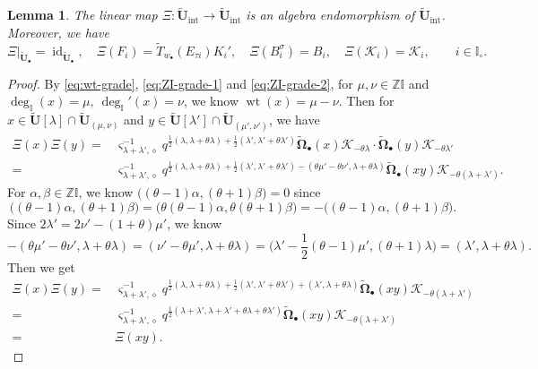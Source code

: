 \documentclass[a4paper,reqno,12pt]{amsart}
\numberwithin{equation}{section}
\newtheorem{lemma}[proposition]{Lemma}
\theoremstyle{definition}
\theoremstyle{plain}
\theoremstyle{definition}
\def\Z{\mathbb Z}
\def\I{\mathbb I}
\def\wI{\I_\circ}
\def\bw{w_\bullet}
\def\tU{\widetilde{\mathbf U}}
\def \tbU{\tU_{\bullet}}
\def\tTD{\widetilde T}
\def\cK{\mathcal K}
\def\vs{\varsigma}
\def\dm{\diamond}
\def \wObb{\widetilde{\mathbf{\Omega}}_\bullet}
\newcommand{\id}{\operatorname{id}}
\newcommand{\wt}{\operatorname{wt}}
\begin{document}
\begin{lemma}\label{lem:Xi is alge-homomorphism}
   The linear map $\Xi:\tU_{\text{int}}\longrightarrow\tU_{\text{int}}$ is an algebra endomorphism of $\tU_{\text{int}}$. Moreover, we have
   \begin{equation}\label{eq:formula of Xi on generators}
      \Xi|_{\tbU}=\id_{\tbU},\quad \Xi(F_i)=\tTD_{\bw}(E_{\tau i})K_i',\quad \Xi(B_i^\sigma)=B_i,\quad \Xi(\cK_i)=\cK_i,\qquad i\in\wI.
   \end{equation}
\end{lemma}
\begin{proof}
  By \eqref{eq:wt-grade}, \eqref{eq:ZI-grade-1} and \eqref{eq:ZI-grade-2}, for $\mu,\nu\in\Z\I$ and $\deg_\I(x)=\mu,\ \deg_\I'(x)=\nu$, we know  $\wt(x)=\mu-\nu$. Then for $x\in\tU[\lambda]\cap\tU_{(\mu,\nu)}$ and $y\in\tU[\lambda']\cap\tU_{(\mu',\nu')}$, we have
  \begin{align*}
   \Xi(x)\Xi(y)=& \vs_{\lambda+\lambda',\dm}^{-1}q^{\frac{1}{2}(\lambda,\lambda+\theta\lambda)+\frac{1}{2}(\lambda',\lambda'+\theta\lambda')}\wObb(x)\cK_{-\theta\lambda}\cdot \wObb(y)\cK_{-\theta\lambda'}\\
   =&\vs_{\lambda+\lambda',\dm}^{-1}q^{\frac{1}{2}(\lambda,\lambda+\theta\lambda)+\frac{1}{2}(\lambda',\lambda'+\theta\lambda')-(\theta\mu'-\theta\nu',\lambda+\theta\lambda)}\wObb(xy)\cK_{-\theta(\lambda+\lambda')}.
  \end{align*}
  For $\alpha,\beta\in\Z\I$, we know $\big((\theta-1)\alpha,(\theta+1)\beta\big)=0$ since 
  \[\big((\theta-1)\alpha,(\theta+1)\beta\big)=\big(\theta(\theta-1)\alpha,\theta(\theta+1)\beta\big)=-\big((\theta-1)\alpha,(\theta+1)\beta\big).\]
  Since $2\lambda'=2\nu'-(1+\theta)\mu'$, we know\
  \begin{equation*}
   -(\theta\mu'-\theta\nu',\lambda+\theta\lambda)=(\nu'-\theta\mu',\lambda+\theta\lambda)=\big(\lambda'-\frac{1}{2}(\theta-1)\mu',(\theta+1)\lambda\big)=(\lambda',\lambda+\theta\lambda).   
  \end{equation*}
  Then we get
  \begin{align*}
    \Xi(x)\Xi(y)=&\vs_{\lambda+\lambda',\dm}^{-1}q^{\frac{1}{2}(\lambda,\lambda+\theta\lambda)+\frac{1}{2}(\lambda',\lambda'+\theta\lambda')+(\lambda',\lambda+\theta\lambda)}\wObb(xy)\cK_{-\theta(\lambda+\lambda')}\\
    =&\vs_{\lambda+\lambda',\dm}^{-1}q^{\frac{1}{2}(\lambda+\lambda',\lambda+\lambda'+\theta\lambda+\theta\lambda')}\wObb(xy)\cK_{-\theta(\lambda+\lambda')}\\
    =&\Xi(xy).
  \end{align*}
  

\end{proof}
\end{document}
